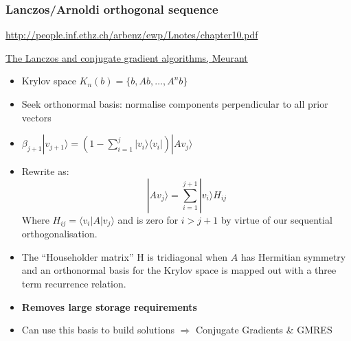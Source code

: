 \documentclass[pdf,ps,8pt]{beamer}
\newcommand{\link}[1]{\href{#1}{ {\color{blue} #1} }}
\begin{document}
  \begin{frame}[fragile]\small\frametitle{ Lanczos/Arnoldi orthogonal sequence}

    \link{http://people.inf.ethz.ch/arbenz/ewp/Lnotes/chapter10.pdf}
    
    \href{https://www.researchgate.net/publication/232023768_The_Lanczos_and_conjugate_gradient_algorithms_in_finite_precision_arithmetic}
         {{\color{blue} The Lanczos and conjugate gradient algorithms, Meurant}}

    \begin{itemize}
      \item Krylov space $K_n(b) = \{ b, A b , \ldots , A^n b \}$
      \item Seek orthonormal basis: normalise components perpendicular to all prior vectors
      \item $\beta_{j+1}| v_{j+1} \rangle = (1 - \sum\limits_{i=1}^j |v_i\rangle \langle v_i | )|A v_j \rangle $
      \item Rewrite as:
        $$
        | A v_j \rangle =  \sum\limits_{i=1}^{j+1}  | v_i \rangle H_{ij}
        $$
        Where $H_{ij} = \langle v_i |A| v_j \rangle$ and is zero for $i>j+1$ by virtue of our sequential orthogonalisation.
      \item The ``Householder matrix'' H is tridiagonal when $A$ has Hermitian symmetry and an orthonormal basis for the Krylov space
             is mapped out with a three term recurrence relation.\\
      \item{ \bf Removes large storage requirements}
      \item Can use this basis to build solutions $\Rightarrow$ Conjugate Gradients \& GMRES
      \end{itemize}

  \end{frame}
\end{document}
